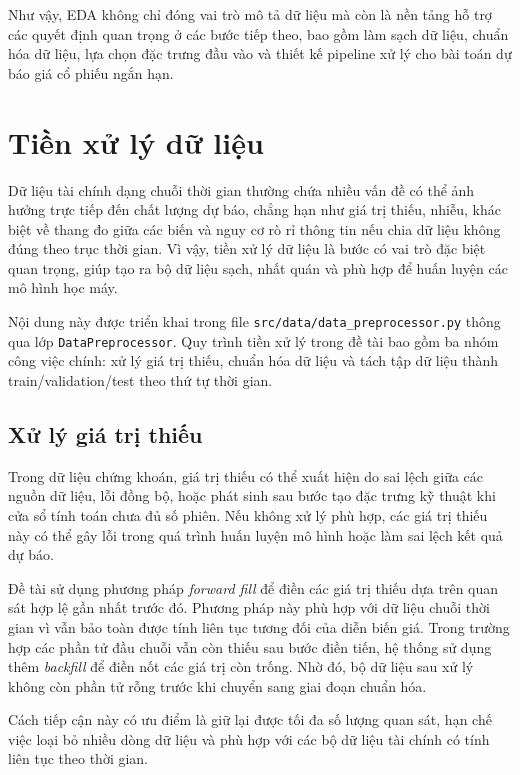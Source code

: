 Như vậy, EDA không chỉ đóng vai trò mô tả dữ liệu mà còn là nền tảng hỗ trợ các quyết định quan trọng ở các bước tiếp theo, bao gồm làm sạch dữ liệu, chuẩn hóa dữ liệu, lựa chọn đặc trưng đầu vào và thiết kế pipeline xử lý cho bài toán dự báo giá cổ phiếu ngắn hạn.
\section{Tiền xử lý dữ liệu}
\label{sec:tien_xu_ly_du_lieu}

Dữ liệu tài chính dạng chuỗi thời gian thường chứa nhiều vấn đề có thể ảnh hưởng trực tiếp đến chất lượng dự báo, chẳng hạn như giá trị thiếu, nhiễu, khác biệt về thang đo giữa các biến và nguy cơ rò rỉ thông tin nếu chia dữ liệu không đúng theo trục thời gian. Vì vậy, tiền xử lý dữ liệu là bước có vai trò đặc biệt quan trọng, giúp tạo ra bộ dữ liệu sạch, nhất quán và phù hợp để huấn luyện các mô hình học máy.

Nội dung này được triển khai trong file \texttt{src/data/data\_preprocessor.py} thông qua lớp \texttt{DataPreprocessor}. Quy trình tiền xử lý trong đề tài bao gồm ba nhóm công việc chính: xử lý giá trị thiếu, chuẩn hóa dữ liệu và tách tập dữ liệu thành train/validation/test theo thứ tự thời gian.

\subsection{Xử lý giá trị thiếu}

Trong dữ liệu chứng khoán, giá trị thiếu có thể xuất hiện do sai lệch giữa các nguồn dữ liệu, lỗi đồng bộ, hoặc phát sinh sau bước tạo đặc trưng kỹ thuật khi cửa sổ tính toán chưa đủ số phiên. Nếu không xử lý phù hợp, các giá trị thiếu này có thể gây lỗi trong quá trình huấn luyện mô hình hoặc làm sai lệch kết quả dự báo.

Đề tài sử dụng phương pháp \textit{forward fill} để điền các giá trị thiếu dựa trên quan sát hợp lệ gần nhất trước đó. Phương pháp này phù hợp với dữ liệu chuỗi thời gian vì vẫn bảo toàn được tính liên tục tương đối của diễn biến giá. Trong trường hợp các phần tử đầu chuỗi vẫn còn thiếu sau bước điền tiến, hệ thống sử dụng thêm \textit{backfill} để điền nốt các giá trị còn trống. Nhờ đó, bộ dữ liệu sau xử lý không còn phần tử rỗng trước khi chuyển sang giai đoạn chuẩn hóa.

Cách tiếp cận này có ưu điểm là giữ lại được tối đa số lượng quan sát, hạn chế việc loại bỏ nhiều dòng dữ liệu và phù hợp với các bộ dữ liệu tài chính có tính liên tục theo thời gian.

